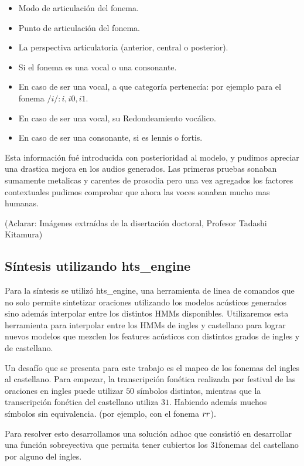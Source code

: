 \begin{itemize}
\item Modo de articulación del fonema.
\item Punto de articulación del fonema.
\item La perspectiva articulatoria (anterior, central o posterior).
\item Si el fonema es una vocal o una consonante.
\item En caso de ser una vocal, a que categoría pertenecía: por ejemplo para el fonema $/i/: {i, i0,i1}$.
\item En caso de ser una vocal, su Redondeamiento vocálico.
\item En caso de ser una consonante, si es lennis o fortis.
\end{itemize}

Esta información fué introducida con posterioridad al modelo, y pudimos apreciar una drastica mejora en los audios generados. Las primeras pruebas sonaban sumamente metalicas y carentes de prosodia pero una vez agregados los factores contextuales pudimos comprobar que ahora las voces sonaban mucho mas humanas.


(Aclarar: Imágenes extraídas de la disertación doctoral, Profesor Tadashi Kitamura)
\subsection{Síntesis utilizando hts\_engine}

Para la síntesis se utilizó hts\_engine, una herramienta de linea de comandos que no solo permite sintetizar oraciones utilizando los modelos acústicos generados sino además interpolar entre los distintos HMMs disponibles. Utilizaremos esta herramienta para interpolar entre los HMMs de ingles y castellano para lograr nuevos modelos que mezclen los features acústicos con distintos grados de ingles y de castellano.

Un desafío que se presenta para este trabajo es el mapeo de los fonemas del ingles al castellano. Para empezar, la transcripción fonética realizada por festival de las oraciones en ingles puede utilizar $50$ símbolos distintos, mientras que la transcripción fonética del castellano utiliza $31$. Habiendo además muchos símbolos sin equivalencia. (por ejemplo, con el fonema $\/rr$).

Para resolver esto desarrollamos una solución adhoc que consistió en desarrollar una función sobreyectiva que permita tener cubiertos los $31$fonemas del castellano por alguno del ingles.

